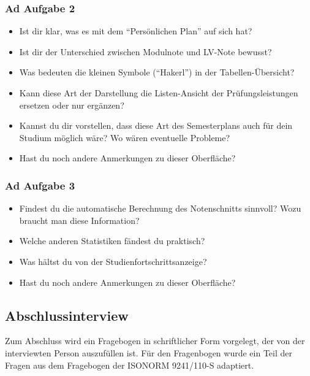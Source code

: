 \documentclass[a4paper,10pt]{scrartcl}
\begin{document}
\subsubsection*{Ad Aufgabe 2}

\begin{itemize}
 \item Ist dir klar, was es mit dem ``Persönlichen Plan'' auf sich hat?
 \item Ist dir der Unterschied zwischen Modulnote und LV-Note bewusst?
 \item Was bedeuten die kleinen Symbole (``Hakerl'') in der Tabellen-Übersicht?
 \item Kann diese Art der Darstellung die Listen-Ansicht der Prüfungsleistungen ersetzen oder nur ergänzen?
 \item Kannst du dir vorstellen, dass diese Art des Semesterplans auch für dein Studium möglich wäre? Wo wären eventuelle Probleme?
 \item Hast du noch andere Anmerkungen zu dieser Oberfläche?
\end{itemize}

\subsubsection*{Ad Aufgabe 3}

\begin{itemize}
 \item Findest du die automatische Berechnung des Notenschnitts sinnvoll? Wozu braucht man diese Information?
 \item Welche anderen Statistiken fändest du praktisch?
 \item Was hältst du von der Studienfortschrittsanzeige?
 \item Hast du noch andere Anmerkungen zu dieser Oberfläche?
\end{itemize}

\subsection{Abschlussinterview}

Zum Abschluss wird ein Fragebogen in schriftlicher Form vorgelegt, der von der interviewten Person auszufüllen ist. 
Für den Fragenbogen wurde ein Teil der Fragen aus dem Fragebogen 
der ISONORM 9241/110-S adaptiert.
\end{document}
